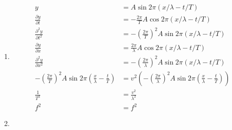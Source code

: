 \documentclass{article}
\begin{document}
\begin{enumerate}
\begin{enumerate}
          \item

                \begin{align*}
                  y                                                                                             & = A \sin 2 \pi (x / \lambda - t / T)                                                                                     \\
                  \frac{\partial y}{\partial t}                                                                 & = -\frac{2 \pi}{T} A \cos 2 \pi (x / \lambda - t / T)                                                                    \\
                  \frac{\partial^2 y}{\partial t^2}                                                             & = -\left( \frac{2 \pi}{T} \right)^2 A \sin 2 \pi (x / \lambda - t / T)                                                   \\
                  \frac{\partial y}{\partial x}                                                                 & = \frac{2 \pi}{\lambda} A \cos 2 \pi (x / \lambda - t / T)                                                               \\
                  \frac{\partial^2 y}{\partial x^2}                                                             & = -\left( \frac{2 \pi}{\lambda} \right)^2 A \sin 2 \pi (x / \lambda - t / T)                                             \\
                  -\left( \frac{2 \pi}{T} \right)^2 A \sin 2 \pi \left( \frac{x}{\lambda} - \frac{t}{T} \right) & = v^2 \left( -\left( \frac{2 \pi}{\lambda} \right)^2 A \sin 2 \pi \left( \frac{x}{\lambda} - \frac{t}{T} \right) \right) \\
                  \frac{1}{T^2}                                                                                 & = \frac{v^2}{\lambda^2}                                                                                                  \\
                  f^2                                                                                           & = f^2
                \end{align*}

          \item


\end{enumerate}
\end{enumerate}
\end{document}
